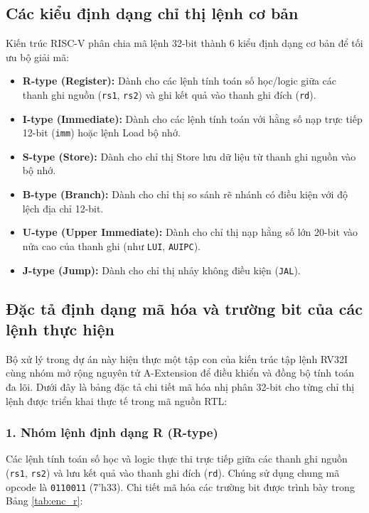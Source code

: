 \subsection{Các kiểu định dạng chỉ thị lệnh cơ bản}
Kiến trúc RISC-V phân chia mã lệnh 32-bit thành 6 kiểu định dạng cơ bản để tối ưu bộ giải mã:
\begin{itemize}
    \item \textbf{R-type (Register):} Dành cho các lệnh tính toán số học/logic giữa các thanh ghi nguồn (\texttt{rs1}, \texttt{rs2}) và ghi kết quả vào thanh ghi đích (\texttt{rd}).
    \item \textbf{I-type (Immediate):} Dành cho các lệnh tính toán với hằng số nạp trực tiếp 12-bit (\texttt{imm}) hoặc lệnh Load bộ nhớ.
    \item \textbf{S-type (Store):} Dành cho chỉ thị Store lưu dữ liệu từ thanh ghi nguồn vào bộ nhớ.
    \item \textbf{B-type (Branch):} Dành cho chỉ thị so sánh rẽ nhánh có điều kiện với độ lệch địa chỉ 12-bit.
    \item \textbf{U-type (Upper Immediate):} Dành cho chỉ thị nạp hằng số lớn 20-bit vào nửa cao của thanh ghi (như \texttt{LUI}, \texttt{AUIPC}).
    \item \textbf{J-type (Jump):} Dành cho chỉ thị nhảy không điều kiện (\texttt{JAL}).
\end{itemize}

\subsection{Đặc tả định dạng mã hóa và trường bit của các lệnh thực hiện}
Bộ xử lý trong dự án này hiện thực một tập con của kiến trúc tập lệnh RV32I cùng nhóm mở rộng nguyên tử A-Extension để điều khiển và đồng bộ tính toán đa lõi. Dưới đây là bảng đặc tả chi tiết mã hóa nhị phân 32-bit cho từng chỉ thị lệnh được triển khai thực tế trong mã nguồn RTL:

\subsubsection{1. Nhóm lệnh định dạng R (R-type)}
Các lệnh tính toán số học và logic thực thi trực tiếp giữa các thanh ghi nguồn (\texttt{rs1}, \texttt{rs2}) và lưu kết quả vào thanh ghi đích (\texttt{rd}). Chúng sử dụng chung mã opcode là \texttt{0110011} (7'h33). Chi tiết mã hóa các trường bit được trình bày trong Bảng \ref{tab:enc_r}:

